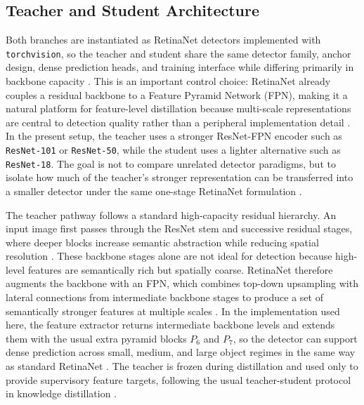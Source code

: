 \documentclass[12pt]{article}
\begin{document}
\subsection{Teacher and Student Architecture}
Both branches are instantiated as RetinaNet detectors implemented with \texttt{torchvision}, so the teacher and student share the same detector family, anchor design, dense prediction heads, and training interface while differing primarily in backbone capacity \cite{lin2017focal}. This is an important control choice: RetinaNet already couples a residual backbone to a Feature Pyramid Network (FPN), making it a natural platform for feature-level distillation because multi-scale representations are central to detection quality rather than a peripheral implementation detail \cite{he2016resnet,lin2017fpn,lin2017focal}. In the present setup, the teacher uses a stronger ResNet-FPN encoder such as \texttt{ResNet-101} or \texttt{ResNet-50}, while the student uses a lighter alternative such as \texttt{ResNet-18}. The goal is not to compare unrelated detector paradigms, but to isolate how much of the teacher's stronger representation can be transferred into a smaller detector under the same one-stage RetinaNet formulation \cite{hinton2015distilling,romero2015fitnets,wang2019distilling}.

The teacher pathway follows a standard high-capacity residual hierarchy. An input image first passes through the ResNet stem and successive residual stages, where deeper blocks increase semantic abstraction while reducing spatial resolution \cite{he2016resnet}. These backbone stages alone are not ideal for detection because high-level features are semantically rich but spatially coarse. RetinaNet therefore augments the backbone with an FPN, which combines top-down upsampling with lateral connections from intermediate backbone stages to produce a set of semantically stronger features at multiple scales \cite{lin2017fpn}. In the implementation used here, the feature extractor returns intermediate backbone levels and extends them with the usual extra pyramid blocks $P_6$ and $P_7$, so the detector can support dense prediction across small, medium, and large object regimes in the same way as standard RetinaNet \cite{lin2017focal}. The teacher is frozen during distillation and used only to provide supervisory feature targets, following the usual teacher-student protocol in knowledge distillation \cite{hinton2015distilling}.
\end{document}
